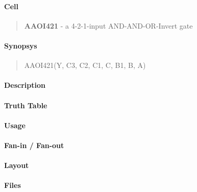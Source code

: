 \label{AAOI421}
\paragraph{Cell}
\begin{quote}
    \textbf{AAOI421} - a 4-2-1-input AND-AND-OR-Invert gate
\end{quote}

\paragraph{Synopsys}
\begin{quote}
    AAOI421(Y, C3, C2, C1, C, B1, B, A)
\end{quote}

\paragraph{Description}

%

\paragraph{Truth Table}
%

\paragraph{Usage}

\paragraph{Fan-in / Fan-out}

\paragraph{Layout}

\paragraph{Files}
